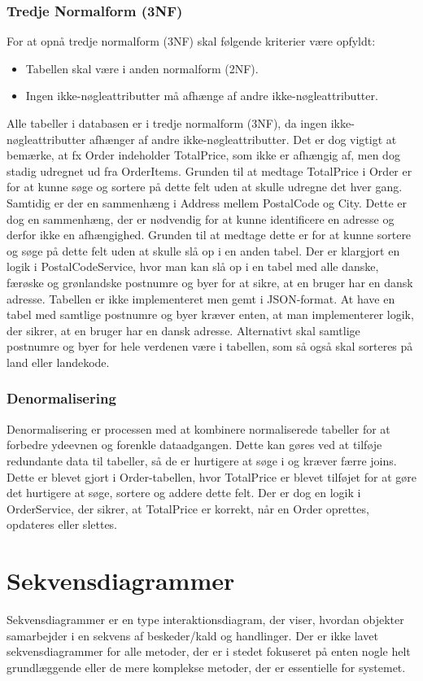 \subsubsection{Tredje Normalform (3NF)}
For at opnå tredje normalform (3NF) skal følgende kriterier være opfyldt:
\begin{itemize}
    \item Tabellen skal være i anden normalform (2NF).
    \item Ingen ikke-nøgleattributter må afhænge af andre ikke-nøgleattributter.
\end{itemize}
Alle tabeller i databasen er i tredje normalform (3NF), da ingen ikke-nøgleattributter afhænger af andre ikke-nøgleattributter.
Det er dog vigtigt at bemærke, at fx Order indeholder TotalPrice, som ikke er afhængig af, men dog stadig udregnet ud fra OrderItems.
Grunden til at medtage TotalPrice i Order er for at kunne søge og sortere på dette felt uden at skulle udregne det hver gang.
Samtidig er der en sammenhæng i Address mellem PostalCode og City. Dette er dog en sammenhæng, der er nødvendig for at kunne identificere en adresse og derfor ikke en afhængighed.
Grunden til at medtage dette er for at kunne sortere og søge på dette felt uden at skulle slå op i en anden tabel.
Der er klargjort en logik i PostalCodeService, hvor man kan slå op i en tabel med alle danske, færøske og grønlandske postnumre og byer for at sikre, at en bruger har en dansk adresse.
Tabellen er ikke implementeret men gemt i JSON-format. At have en tabel med samtlige postnumre og byer kræver enten, at man implementerer logik, der sikrer, at en bruger har en dansk adresse. 
Alternativt skal samtlige postnumre og byer for hele verdenen være i tabellen, som så også skal sorteres på land eller landekode.

\subsubsection{Denormalisering}
Denormalisering er processen med at kombinere normaliserede tabeller for at forbedre ydeevnen og forenkle dataadgangen. 
Dette kan gøres ved at tilføje redundante data til tabeller, så de er hurtigere at søge i og kræver færre joins.
Dette er blevet gjort i Order-tabellen, hvor TotalPrice er blevet tilføjet for at gøre det hurtigere at søge, sortere og addere dette felt.
Der er dog en logik i OrderService, der sikrer, at TotalPrice er korrekt, når en Order oprettes, opdateres eller slettes.

\section{Sekvensdiagrammer}
\label{sec:sekvens-diagrammer}
Sekvensdiagrammer er en type interaktionsdiagram, der viser, hvordan objekter samarbejder i en sekvens af beskeder/kald og handlinger.
Der er ikke lavet sekvensdiagrammer for alle metoder, der er i stedet fokuseret på enten nogle helt grundlæggende eller de mere komplekse metoder, der er essentielle for systemet.

